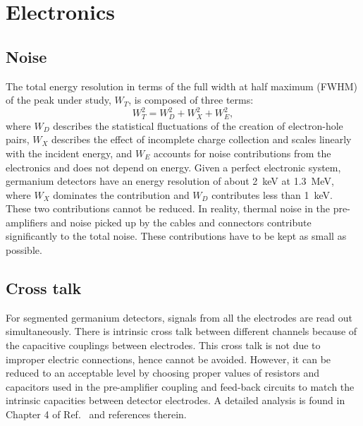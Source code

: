 \section{Electronics}
\label{sec:det:elec}

\subsection{Noise}
\label{sec:det:noise}
The total energy resolution in terms of the full width at half maximum
(FWHM) of the peak under study, $W_{T}$, is composed of three terms:
\begin{equation}
W_{T}^{2} = W_{D}^{2} + W_{X}^{2} + W_{E}^{2},
\end{equation}
where $W_{D}$ describes the statistical fluctuations of the creation
of electron-hole pairs, $W_{X}$ describes the effect of incomplete
charge collection and scales linearly with the incident energy, and
$W_{E}$ accounts for noise contributions from the electronics and does
not depend on energy. Given a perfect electronic system, germanium
detectors have an energy resolution of about 2~keV at 1.3~MeV, where
$W_{X}$ dominates the contribution and $W_{D}$ contributes less than
1~keV. These two contributions cannot be reduced. In reality, thermal
noise in the pre-amplifiers and noise picked up by the cables and
connectors contribute significantly to the total noise. These
contributions have to be kept as small as possible.

\subsection{Cross talk}
\label{sec:det:xtalk}
For segmented germanium detectors, signals from all the electrodes are
read out simultaneously. There is intrinsic cross talk between
different channels because of the capacitive couplings between
electrodes. This cross talk is not due to improper electric
connections, hence cannot be avoided. However, it can be reduced to
an acceptable level by choosing proper values of resistors and
capacitors used in the pre-amplifier coupling and feed-back circuits
to match the intrinsic capacities between detector electrodes. A
detailed analysis is found in Chapter 4 of Ref.~\cite{Bru06} and
references therein.

